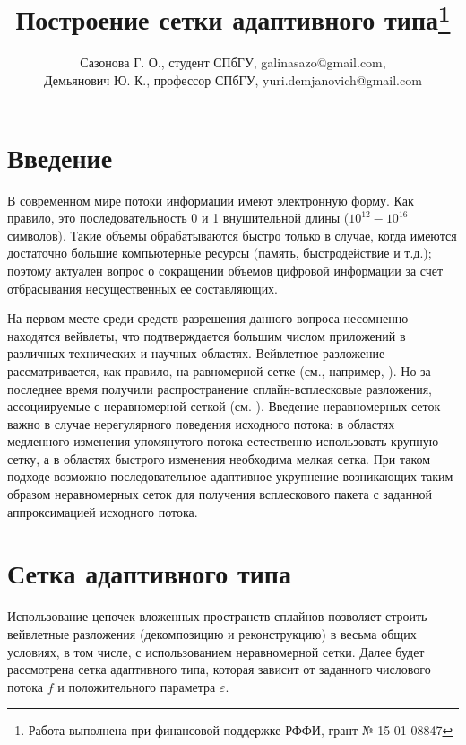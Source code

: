 \documentclass{spisok-article}
\title{Построение сетки адаптивного типа\thanks{Работа выполнена при финансовой поддержке РФФИ, грант № 15-01-08847}
}
\author{Сазонова Г. О., студент СПбГУ, galinasazo@gmail.com,\\Демьянович Ю. К., профессор СПбГУ, yuri.demjanovich@gmail.com}
\begin{document}
\newcommand{\defabove}{\stackrel{\rm def}{=\kern-3.6pt=}}

\newcommand{\textlbrackdblMSTUB}{[\hspace{-2pt}[}
\newcommand{\textrbrackdblMSTUB}{]\hspace{-2pt}]}
\newcommand{\textlbrackdblSTUB}{$\textlbrackdblMSTUB$}
\newcommand{\textrbrackdblSTUB}{$\textrbrackdblMSTUB$}


\maketitle

\section{Введение}
   В современном мире потоки информации имеют электронную форму.
   Как правило, это последовательность 0 и 1 внушительной длины
   ($10^{12} - 10^{16}$ символов). Такие объемы обрабатываются быстро
   только в случае, когда имеются достаточно большие компьютерные ресурсы
   (память, быстродействие и т.д.); поэтому актуален вопрос о сокращении
   объемов цифровой информации за счет отбрасывания несущественных
   ее составляющих.

   На первом месте среди средств разрешения данного вопроса
   несомненно находятся вейвлеты, что подтверждается большим числом
   приложений в различных технических и научных областях. Вейвлетное
   разложение рассматривается, как правило, на равномерной сетке
   (см., например, \cite{leb, ter}). Но за последнее время получили
   распространение сплайн-всплесковые  разложения, ассоциируемые с
   неравномерной сеткой (см. \cite{mall, dem}). Введение неравномерных
   сеток важно в случае нерегулярного поведения исходного потока: в
   областях медленного изменения упомянутого потока естественно
   использовать крупную сетку, а в областях быстрого изменения
   необходима мелкая сетка. При таком подходе возможно
   последовательное адаптивное укрупнение возникающих таким образом
   неравномерных сеток для получения всплескового пакета с заданной
   аппроксимацией исходного потока.
   \section{Сетка адаптивного типа}
    Использование цепочек вложенных пространств сплайнов позволяет
  строить вейвлетные разложения (декомпозицию и реконструкцию)
  в весьма общих условиях, в том числе, с использованием неравномерной
  сетки. Далее будет рассмотрена сетка адаптивного типа, которая
  зависит от заданного числового потока $f$ и положительного параметра
  $\varepsilon$.
\end{document}
